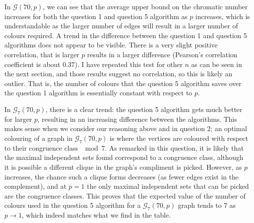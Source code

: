\documentclass{article}
\begin{document}
\begin{center}
\end{center}

In $\mathcal{G}(70,p)$, we can see that the average upper bound on the chromatic number increases for both the question 1 and question 5 algorithm as $p$ increases, which is understandable as the larger number of edges will result in a larger number of colours required. A trend in the difference between the question 1 and question 5 algorithms does not appear to be visible. There is a very slight positive correlation, that is larger $p$ results in a larger difference (Pearson's correlation coefficient is about $0.37$). I have repeated this test for other $n$ as can be seen in the next section, and those results suggest no correlation, so this is likely an outlier. That is, the number of colours that the question 5 algorithm saves over the question 1 algorithm is essentially constant with respect to $p$.

In $\mathcal{G}_7(70,p)$, there is a clear trend: the question 5 algorithm gets much better for larger $p$, resulting in an increasing difference between the algorithms. This makes sense when we consider our reasoning above and in question 2; an optimal colouring of a graph in $\mathcal{G}_7(70,p)$ is where the vertices are coloured with respect to their congruence class $\mod 7$. As remarked in this question, it is likely that the maximal independent sets found correspond to a congruence class, although it is possible a different clique in the graph's compliment is picked. However, as $p$ increases, the chance such a clique forms decreases (as fewer edges exist in the complement), and at $p=1$ the only maximal independent sets that can be picked are the congruence classes. This proves that the expected value of the number of colours used in the question 5 algorithm for a $\mathcal{G}_7(70,p)$ graph tends to $7$ as $p \to 1$, which indeed matches what we find in the table.
\end{document}
